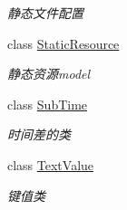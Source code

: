 \begin{DoxyCompactItemize}
\begin{DoxyCompactList}\small\item\em 静态文件配置 \end{DoxyCompactList}\item 
class \hyperlink{class_x_c_l_net_tools_1_1_entity_1_1_static_resource}{Static\-Resource}
\begin{DoxyCompactList}\small\item\em 静态资源model \end{DoxyCompactList}\item 
class \hyperlink{class_x_c_l_net_tools_1_1_entity_1_1_sub_time}{Sub\-Time}
\begin{DoxyCompactList}\small\item\em 时间差的类 \end{DoxyCompactList}\item 
class \hyperlink{class_x_c_l_net_tools_1_1_entity_1_1_text_value}{Text\-Value}
\begin{DoxyCompactList}\small\item\em 键值类 \end{DoxyCompactList}\end{DoxyCompactItemize}
